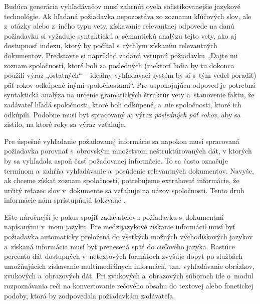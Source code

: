 \begin{multicols}{2}
Budúca generácia vyhľadávačov musí zahrnúť oveľa sofistikovanejšie jazykové technológie. Ak hľadaná požiadavka nepozostáva zo zoznamu kľúčových slov, ale z~otázky alebo z~iného typu vety, získavanie relevantnej odpovede na danú požiadavku si vyžaduje syntaktickú a~sémantickú analýzu tejto vety, ako aj dostupnosť indexu, ktorý by počítal s~rýchlym získaním relevantných dokumentov. Predstavte si napríklad zadanú vstupnú požiadavku „Dajte mi zoznam spoločností, ktoré boli za posledných (niektorí ľudia by tu dokonca použili výraz „ostatných“ – ideálny vyhľadávací systém by si s~tým vedel poradiť) päť rokov odkúpené inými spoločnosťami“. Pre uspokojujúcu odpoveď je potrebná syntaktická {analýza} na určenie gramatických štruktúr vety a~stanovenie faktu, že zadávateľ hľadá spoločnosti, ktoré boli odkúpené, a~nie spoločnosti, ktoré ich odkúpili. Podobne musí byť spracovaný aj výraz \emph{posledných päť rokov}, aby sa zistilo, na ktoré roky sa výraz vzťahuje. 


Pre úspešné vyhľadanie požadovanej informácie sa napokon musí spracovaná požiadavka porovnať s~obrovským množstvom neštruktúrovaných dát, v ktorých by sa vyhľadala aspoň časť požadovanej informácie. To sa často označuje termínom  a~zahŕňa vyhľadávanie a~posúdenie relevantných dokumentov. Navyše, ak chceme získať zoznam spoločností, potrebujeme extrahovať informácie, že určitý reťazec slov v~dokumente sa vzťahuje na názov spoločnosti. Tento druh informácie nám sprístupňujú takzvané .

Ešte náročnejší je pokus spojiť zadávateľovu požiadavku
s~dokumentmi napísanými v~inom jazyku. Pre medzijazykové
získanie informácií musí byť požiadavka automaticky preložená
do všetkých možných východiskových jazykov a~získaná informácia
musí byť prenesená späť do cieľového jazyka. Rastúce percento
dát dostupných v~netextových formátoch zvyšuje dopyt po službách
umožňujúcich získavanie multimediálnych informácií,
tzn. vyhľadávanie obrázkov, zvukových a~obrazových dát. Pri
zvukových a~obrazových súboroch ide o~modul rozpoznávania
reči na konvertovanie rečového obsahu do textovej alebo fonetickej
podoby, ktorá by zodpovedala požiadavkám zadávateľa.


\end{multicols}
